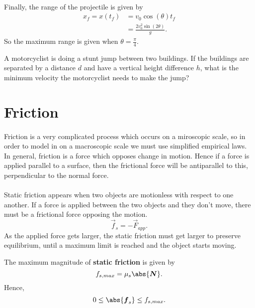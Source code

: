 \documentclass[../classical_mechanics.tex]{subfiles}
\begin{document}
        \paragraph{}
        Finally, the range of the projectile is given by
        \begin{align}
            x_f = x(t_f) &= v_0\cos(\theta)t_f\\
            &= \frac{2v_0^2\sin(2\theta)}{g}.
        \end{align}
        So the maximum range is given when $\theta=\frac{\pi}{4}$.


        \begin{example}
            A motorcyclist is doing a stunt jump between two buildings.
            If the buildings are separated by a distance $d$ and have a vertical height difference $h$, what is the minimum velocity the motorcyclist needs to make the jump?
        \end{example}

    \section{Friction}
        \paragraph{}
        Friction is a very complicated process which occurs on a miroscopic scale, so in order to model in on a macroscopic scale we must use simplified empirical laws.
        In general, friction is a force which opposes change in motion. Hence if a force is applied parallel to a surface, then the frictional force will be antiparallel to this, perpendicular to the normal force.

        \paragraph{}
        Static friction appears when two objects are motionless with respect to one another.
        If a force is applied between the two objects and they don't move, there must be a frictional force opposing the motion.
        \begin{equation}
            \vec{f}_s=-\vec{F}_{app}.
        \end{equation}
        As the applied force gets larger, the static friction must get larger to preserve equilibrium, until a maximum limit is reached and the object starts moving.
        \begin{definition}
            The maximum magnitude of \textbf{static friction} is given by
            \begin{equation}
                f_{s,max}=\mu_s\abs{\vec{N}}.
            \end{equation}
            Hence,
            \begin{equation}
                0\leq\abs{\vec{f}_s}\leq f_{s,max}.
            \end{equation}
        \end{definition}
\end{document}
